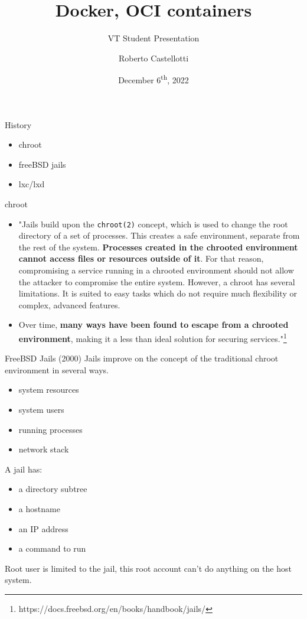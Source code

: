 \documentclass[english]{tumbeamer}
\title{Docker, OCI containers}
\subtitle{VT Student Presentation }
\author{Roberto Castellotti}
\institute{\theDepartmentName\\\theUniversityName}
\date[06/12/2022]{December 6\textsuperscript{th}, 2022}
\begin{document}
\maketitle

\begin{frame}{History}
\begin{itemize}
    \item chroot
    \item freeBSD jails
    \item lxc/lxd
\end{itemize}
\end{frame}

\begin{frame}{chroot}
\begin{itemize}
    \item "Jails build upon the \texttt{chroot(2)} concept, which is used to change the root directory of a set of processes. This creates a safe environment, separate from the rest of the system. \textbf{Processes created in the chrooted environment cannot access files or resources outside of it}. For that reason, compromising a service running in a chrooted environment should not allow the attacker to compromise the entire system. However, a chroot has several limitations. It is suited to easy tasks which do not require much flexibility or complex, advanced features.
    \item Over time, \textbf{many ways have been found to escape from a chrooted environment}, making it a less than ideal solution for securing services."\footnote{https://docs.freebsd.org/en/books/handbook/jails/} 
\end{itemize}
\end{frame}

\begin{frame}{FreeBSD Jails (2000)}
Jails improve on the concept of the traditional chroot environment in several ways.
\begin{itemize}
    \item system resources
    \item system users
    \item running processes
    \item network stack
\end{itemize}
\vspace{5mm}
A jail has: 
\begin{itemize}
    \item a directory subtree
    \item a hostname
    \item an IP address
    \item a command to run
\end{itemize}
Root user is limited to the jail, this root account can't do anything on the host system.
\end{frame}
\end{document}
